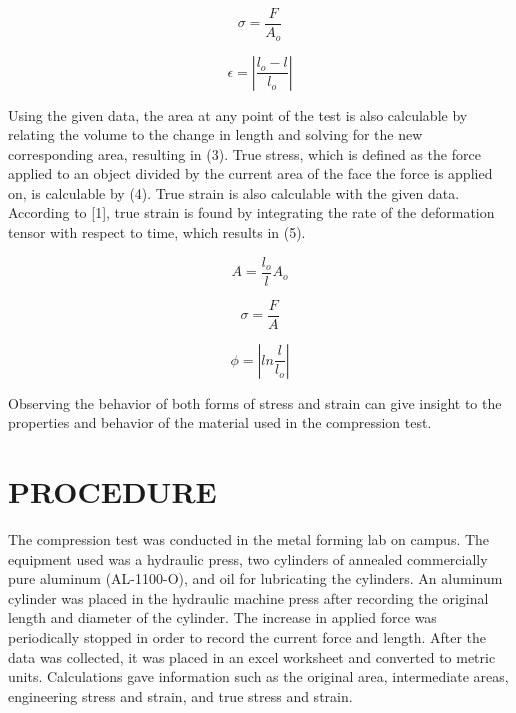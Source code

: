 \documentclass[12pt]{article}
\begin{document}
\bigskip
\begin{equation}
\sigma = \frac{F}{A_{o}}
\end{equation}
\bigskip

\bigskip
\begin{equation}
\epsilon = \left | \frac{l_{o}-l}{l_{o}} \right |
\end{equation}
\bigskip

Using the given data, the area at any point of the test is also calculable by relating the volume to the change in length and solving for the new corresponding area, resulting in (3). True stress, which is defined as the force applied to an object divided by the current area of the face the force is applied on, is calculable by (4). True strain is also calculable with the given data. According to [1], true strain is found by integrating the rate of the deformation tensor with respect to time, which results in (5).

\begin{equation}
A = \frac{l_{o}}{l}A_{o}
\end{equation}

\begin{equation}
\sigma = \frac {F}{A}
\end{equation}
\bigskip

\begin{equation}
\phi = \left | ln \frac{l}{l_{o}} \right |
\end{equation}
\bigskip

Observing the behavior of both forms of stress and strain can give insight to the properties and behavior of the material used in the compression test.
\bigskip


\section*{\fontsize{12}{12}\selectfont PROCEDURE}
The compression test was conducted in the metal forming lab on campus. The equipment used was a hydraulic press, two cylinders of annealed commercially pure aluminum (AL-1100-O), and oil for lubricating the cylinders. An aluminum cylinder was placed in the hydraulic machine press after recording the original length and diameter of the cylinder. The increase in applied force was periodically stopped in order to record the current force and length. After the data was collected, it was placed in an excel worksheet and converted to metric units. Calculations gave information such as the original area, intermediate areas, engineering stress and strain, and true stress and strain.
\bigskip
\end{document}
